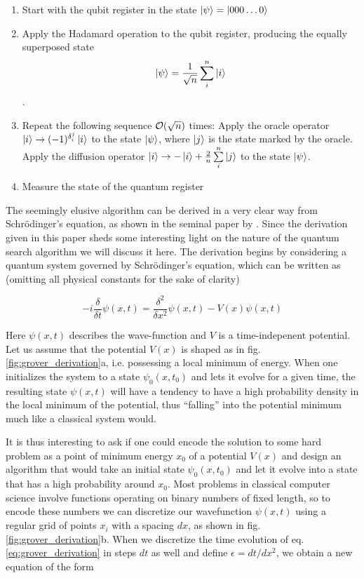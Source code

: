 \begin{enumerate}
 \item Start with the qubit register in the state $\left| \psi \right> = \left| 000\hdots 0 \right>$
 \item Apply the Hadamard operation to the qubit register, producing the equally superposed state $$\left| \psi \right> = \frac{1}{\sqrt{n}}\sum\limits_i^n \left| i \right>$$.
 \item Repeat the following sequence $\begin{mathcal}O\end{mathcal}(\sqrt{n})$ times:
 \subitem Apply the oracle operator $\left| i \right>\to (-1)^{\delta_i^j}\left| i \right>$ to the state $\left| \psi \right>$, where $\left| j \right>$ is the state marked by the oracle.
 \subitem Apply the diffusion operator $\left| i \right> \to -\left| i \right>+\frac{2}{n}\sum\limits_i^n\left| j \right>$ to the state $\left| \psi \right>$.
	\item Measure the state of the quantum register
\end{enumerate}

The seemingly elusive algorithm can be derived in a very clear way from Schrödinger's equation, as shown in the seminal paper by \cite{grover_schrodingers_2001}. Since the derivation given in this paper sheds some interesting light on the nature of the quantum search algorithm we will discuss it here. The derivation begins by considering a quantum system governed by Schrödinger's equation, which can be written as (omitting all physical constants for the sake of clarity)

\begin{equation}
-i\frac{\delta}{\delta t}\psi(x,t) = \frac{\delta^2}{\delta x^2}\psi(x,t)-V(x)\psi(x,t) \label{eq:grover_derivation}
\end{equation}

Here $\psi(x,t)$ describes the wave-function and $V$ is a time-indepenent potential. Let us assume that the potential $V(x)$ is shaped as in fig. \ref{fig:grover_derivation}a, i.e. possessing a local minimum of energy. When one initializes the system to a state $\psi_0(x,t_0)$ and lets it evolve for a given time, the resulting state $\psi(x,t)$ will have a tendency to have a high probability density in the local minimum of the potential, thus ``falling'' into the potential minimum much like a classical system would.

It is thus interesting to ask if one could encode the solution to some hard problem as a point of minimum energy $x_0$ of a potential $V(x)$ and design an algorithm that would take an initial state $\psi_0(x,t_0)$ and let it evolve into a state that has a high probability around $x_0$. Most problems in classical computer science involve functions operating on binary numbers of fixed length, so to encode these numbers we can discretize our wavefunction $\psi(x,t)$ using a regular grid of points $x_i$ with a spacing $dx$, as shown in fig. \ref{fig:grover_derivation}b. When we discretize the time evolution of eq. \ref{eq:grover_derivation} in steps $dt$ as well and define $\epsilon = dt/dx^2$, we obtain a new equation of the form

